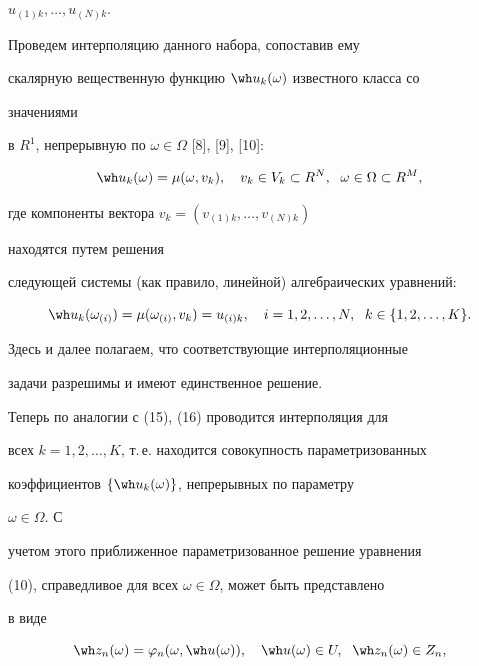 $u_{(1)k},\dotsc,u_{(N)k}$.


Проведем интерполяцию данного набора, сопоставив ему


скалярную вещественную функцию $\wh u_k(\omega)$ известного класса со


значениями


в $R^1$, непрерывную по $\omega\in\Omega$ [8], [9], [10]:


\begin{equation}


\wh u_k(\omega)=\mu(\omega,v_k),\quad


v_k\in V_k\subset R^N,\ \;\omega\in\Omega\subset R^M,


\end{equation}


где компоненты вектора $v_k=(v_{(1)k},\dotsc,v_{(N)k})$


находятся путем решения


следующей системы (как правило, линейной) алгебраических уравнений:


\begin{equation}


\wh u_k(\omega_{(i)})=\mu(\omega_{(i)},v_k)=u_{(i)k},\quad


i=1,2,\dotsc,N,\ \; k\in\{1,2,\dotsc,K\}.


\end{equation}


Здесь и далее полагаем, что соответствующие интерполяционные


задачи разрешимы и имеют единственное решение.


Теперь по аналогии с (15), (16) проводится интерполяция для


всех $k=1,2,\dotsc,K$, т.\,е. находится совокупность параметризованных


коэффициентов $\{\wh u_k(\omega)\}$, непрерывных по параметру


$\omega\in\Omega$. С


учетом этого приближенное параметризованное решение уравнения


(10), справедливое для всех $\omega\in\Omega$, может быть представлено


в виде


\begin{equation}


\wh z_n(\omega)=\varphi_n(\omega,\wh u(\omega)),\quad


\wh u(\omega)\in U,\ \;\wh z_n(\omega)\in Z_n,


\end{equation}


